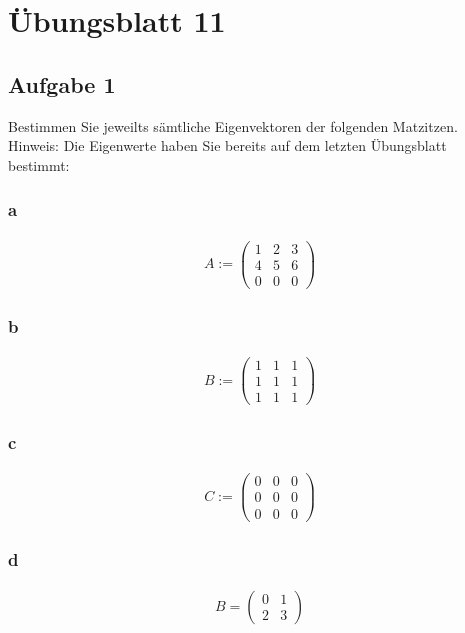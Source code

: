 \chapter{Übungsblatt 11}

\section{Aufgabe 1}
Bestimmen Sie jeweilts sämtliche Eigenvektoren der folgenden Matzitzen. Hinweis: Die Eigenwerte haben Sie bereits auf dem letzten Übungsblatt bestimmt:

\subsection{a}

\begin{align*}
    A := \begin{pmatrix}
        1 & 2 & 3 \\
        4 & 5 & 6 \\ 
        0 & 0 & 0
    \end{pmatrix}
\end{align*}

\subsection{b}

\begin{align*}
    B := \begin{pmatrix}
        1 & 1 & 1 \\
        1 & 1 & 1 \\
        1 & 1 & 1
    \end{pmatrix}
\end{align*}

\subsection{c}

\begin{align*}
    C := \begin{pmatrix}
        0 & 0 & 0 \\
        0 & 0 & 0 \\
        0 & 0 & 0
    \end{pmatrix}
\end{align*}

\subsection{d}

\begin{align*}
    B = \begin{pmatrix}
        0 & 1 \\
        2 & 3
    \end{pmatrix}
\end{align*}